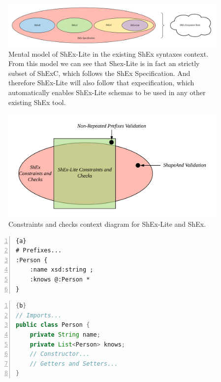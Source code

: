 \begin{figure}
    \includegraphics[width=\textwidth]{images/shex-lite-syntaxes-mental-model.png}
    \centering
    \caption[Mental model of ShEx-Lite in the existing ShEx syntaxes context.]{Mental model of
    ShEx-Lite in the existing ShEx syntaxes context. From this model we can see that Shex-Lite
    is in fact an strictly subset of ShExC, which follows the ShEx Specification. And therefore
    ShEx-Lite will also follow that expecification, which automatically enables ShEx-Lite schemas
    to be used in any other existing ShEx tool.}
    \label{fig:syntax-mental-model}
\end{figure}

\begin{figure}
  \includegraphics[width=\textwidth]{images/shex-lite-constraints-context.png}
  \centering
  \caption[Constraints and checks context diagram for ShEx-Lite and ShEx.]{Constraints
  and checks context diagram for ShEx-Lite and ShEx.}
  \label{fig:constraints-context}
\end{figure}

\begin{center}
	\noindent\begin{minipage}[t]{.4\textwidth}
		\begin{lstlisting}[frame=topline,numbers=left,title=\scriptsize\texttt{Person.shexl}, basicstyle=\ttfamily\scriptsize]{a}
# Prefixes...
:Person {
	:name xsd:string ;
	:knows @:Person *
}
		\end{lstlisting}
	\end{minipage}\hfill
	\begin{minipage}[t]{.5\textwidth}
		\begin{lstlisting}[language=Java, frame=t,numbers=left,title=\scriptsize\texttt{Person.java}, basicstyle=\ttfamily\scriptsize]{b}
// Imports...
public class Person {
	private String name;
	private List<Person> knows;
	// Constructor...
	// Getters and Setters...
}
		\end{lstlisting}
	\end{minipage}
	\label{fig:example-1}
\end{center}